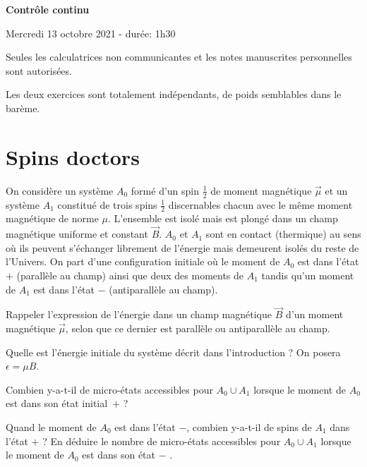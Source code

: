 \documentclass[utf8, 11pt]{feuille}
\begin{document}
\begin{center}
    \Large {\bf Contrôle continu}
    
    Mercredi 13 octobre 2021 - durée: 1h30
\end{center}

Seules les calculatrices non communicantes et les notes manuscrites personnelles sont autorisées.

Les deux exercices sont totalement indépendants, de poids semblables dans le barème.

%





\section{Spins doctors}

On considère un système $A_0$ formé d'un spin $\frac{1}{2}$ de moment magnétique $\Vec{\mu}$ et un système $A_1$ constitué de trois spins $\frac{1}{2}$  discernables chacun avec le même moment magnétique de norme $\mu$. L'ensemble est isolé mais est plongé dans un champ magnétique uniforme et constant $\vec B$. $A_0$ et $A_1$ sont en contact (thermique) au sens où ils peuvent s'échanger librement de l'énergie mais demeurent isolés du reste de l'Univers. On part d'une configuration initiale où le moment de $A_0$ est dans l'état $+$ (parallèle au champ) ainsi que  deux des moments
de $A_1$ tandis qu'un moment de $A_1$ est dans l'état $-$ (antiparallèle au champ).

\medskip

\question Rappeler l'expression de l'énergie dans un champ magnétique $\vec B$ d'un moment magnétique $\Vec{\mu}$,  selon que ce dernier est parallèle ou antiparallèle au champ.

\question Quelle est l'énergie initiale du système décrit dans l'introduction ? On posera $\epsilon=\mu B$.

\question Combien y-a-t-il de micro-états accessibles pour $A_0 \cup A_1$ lorsque le moment de $A_0$ est dans son état \mbox{initial $+$} ? 

\question Quand le moment de $A_0$ est dans l'état $-$, combien y-a-t-il de spins de $A_1$ dans l'état $+$ ? En déduire le nombre de micro-états accessibles pour $A_0 \cup A_1$ lorsque le moment de $A_0$ est dans son état $-$ .
\end{document}
